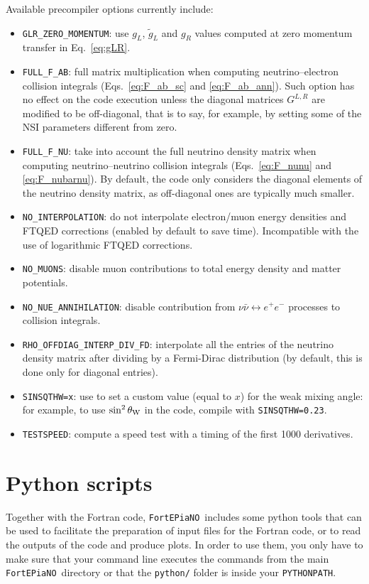 \documentclass[notitlepage,nofootinbib,showpacs,preprintnumbers,amsmath,amssymb,superscriptaddress,prd,onecolumn]{revtex4-1}
\newcommand{\fortepiano}{\texttt{FortEPiaNO}}
\begin{document}
Available precompiler options currently include:
%
\begin{itemize}
%
\item \texttt{GLR\_ZERO\_MOMENTUM}: use $g_L$, $\tilde g_L$ and $g_R$ values
computed at zero momentum transfer \cite{Erler:2013xha} in Eq.~\eqref{eq:gLR}.
%
\item \texttt{FULL\_F\_AB}: full matrix multiplication
when computing neutrino--electron collision integrals
(Eqs.~\eqref{eq:F_ab_sc} and \eqref{eq:F_ab_ann}).
Such option has no effect on the code execution unless the diagonal matrices $G^{L,R}$ are modified to be off-diagonal,
that is to say, for example, by setting some of the NSI parameters different from zero.
%
\item \texttt{FULL\_F\_NU}: take into account the full neutrino density matrix
when computing neutrino--neutrino collision integrals
(Eqs.~\eqref{eq:F_nunu} and \eqref{eq:F_nubarnu}).
By default, the code only considers the diagonal elements of the neutrino density matrix,
as off-diagonal ones are typically much smaller.
%
\item \texttt{NO\_INTERPOLATION}: do not interpolate electron/muon energy densities and FTQED corrections
(enabled by default to save time). Incompatible with the use of logarithmic FTQED corrections.
%
\item \texttt{NO\_MUONS}: disable muon contributions to total energy density and matter potentials.
%
\item \texttt{NO\_NUE\_ANNIHILATION}: disable contribution from $\nu\bar\nu\leftrightarrow e^+e^-$ processes to collision integrals.
%
\item \texttt{RHO\_OFFDIAG\_INTERP\_DIV\_FD}: interpolate all the entries of the neutrino density matrix after dividing by a Fermi-Dirac distribution (by default, this is done only for diagonal entries).
%
\item \texttt{SINSQTHW=x}: use to set a custom value (equal to $x$) for the weak mixing angle: for example, to use $\sin^2\theta_{\rm W}$ in the code, compile with \texttt{SINSQTHW=0.23}.
%
\item \texttt{TESTSPEED}: compute a speed test with a timing of the first 1000 derivatives.
%
\end{itemize}


\section{Python scripts}
\label{sec:python}
Together with the Fortran code, \fortepiano\ includes some python tools
that can be used to facilitate the preparation of input files for the Fortran code,
or to read the outputs of the code and produce plots.
In order to use them,
you only have to make sure that
your command line executes the commands from the main \fortepiano\ directory or
that the \texttt{python/} folder is inside your \texttt{PYTHONPATH}.
\end{document}
